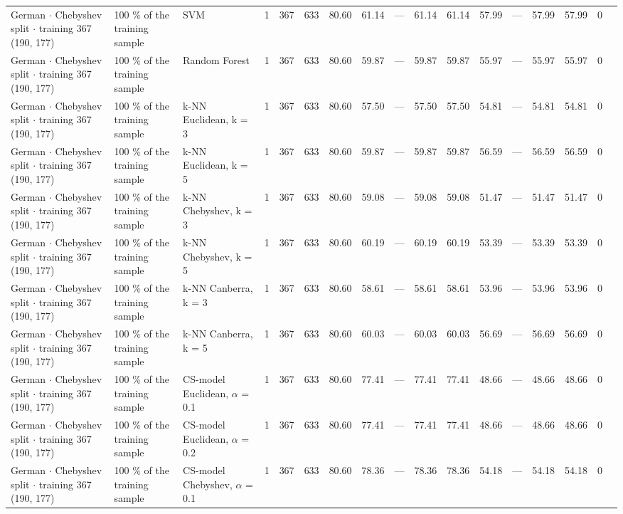 \begin{longtable}{lllrrrrrrrrrrrrrl}
  German $\cdot$ Chebyshev split $\cdot$ training 367 (190, 177) & 100 \% of the training sample & SVM & 1 & 367 & 633 & 80.60 & 61.14 & --- & 61.14 & 61.14 & 57.99 & --- & 57.99 & 57.99 & 0 &  \\
  German $\cdot$ Chebyshev split $\cdot$ training 367 (190, 177) & 100 \% of the training sample & Random Forest & 1 & 367 & 633 & 80.60 & 59.87 & --- & 59.87 & 59.87 & 55.97 & --- & 55.97 & 55.97 & 0 &  \\
  German $\cdot$ Chebyshev split $\cdot$ training 367 (190, 177) & 100 \% of the training sample & k-NN Euclidean, k = 3 & 1 & 367 & 633 & 80.60 & 57.50 & --- & 57.50 & 57.50 & 54.81 & --- & 54.81 & 54.81 & 0 &  \\
  German $\cdot$ Chebyshev split $\cdot$ training 367 (190, 177) & 100 \% of the training sample & k-NN Euclidean, k = 5 & 1 & 367 & 633 & 80.60 & 59.87 & --- & 59.87 & 59.87 & 56.59 & --- & 56.59 & 56.59 & 0 &  \\
  German $\cdot$ Chebyshev split $\cdot$ training 367 (190, 177) & 100 \% of the training sample & k-NN Chebyshev, k = 3 & 1 & 367 & 633 & 80.60 & 59.08 & --- & 59.08 & 59.08 & 51.47 & --- & 51.47 & 51.47 & 0 &  \\
  German $\cdot$ Chebyshev split $\cdot$ training 367 (190, 177) & 100 \% of the training sample & k-NN Chebyshev, k = 5 & 1 & 367 & 633 & 80.60 & 60.19 & --- & 60.19 & 60.19 & 53.39 & --- & 53.39 & 53.39 & 0 &  \\
  German $\cdot$ Chebyshev split $\cdot$ training 367 (190, 177) & 100 \% of the training sample & k-NN Canberra, k = 3 & 1 & 367 & 633 & 80.60 & 58.61 & --- & 58.61 & 58.61 & 53.96 & --- & 53.96 & 53.96 & 0 &  \\
  German $\cdot$ Chebyshev split $\cdot$ training 367 (190, 177) & 100 \% of the training sample & k-NN Canberra, k = 5 & 1 & 367 & 633 & 80.60 & 60.03 & --- & 60.03 & 60.03 & 56.69 & --- & 56.69 & 56.69 & 0 &  \\
  German $\cdot$ Chebyshev split $\cdot$ training 367 (190, 177) & 100 \% of the training sample & CS-model Euclidean, $\alpha$ = 0.1 & 1 & 367 & 633 & 80.60 & 77.41 & --- & 77.41 & 77.41 & 48.66 & --- & 48.66 & 48.66 & 0 &  \\
  German $\cdot$ Chebyshev split $\cdot$ training 367 (190, 177) & 100 \% of the training sample & CS-model Euclidean, $\alpha$ = 0.2 & 1 & 367 & 633 & 80.60 & 77.41 & --- & 77.41 & 77.41 & 48.66 & --- & 48.66 & 48.66 & 0 &  \\
  German $\cdot$ Chebyshev split $\cdot$ training 367 (190, 177) & 100 \% of the training sample & CS-model Chebyshev, $\alpha$ = 0.1 & 1 & 367 & 633 & 80.60 & 78.36 & --- & 78.36 & 78.36 & 54.18 & --- & 54.18 & 54.18 & 0 &  \\

\end{longtable}
